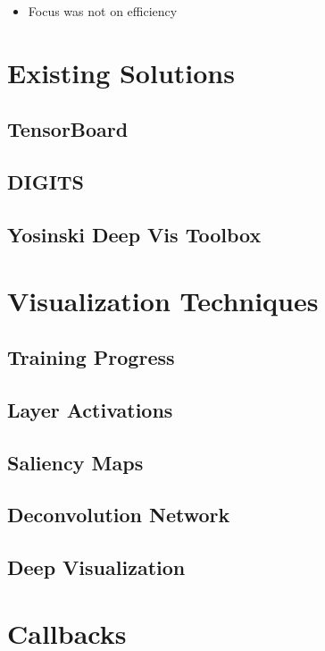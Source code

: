
\begin{itemize}
    \item Focus was not on efficiency
\end{itemize}

\section{Existing Solutions}

\subsection{TensorBoard}

\subsection{DIGITS}

\subsection{Yosinski Deep Vis Toolbox}

\section{Visualization Techniques} 

\subsection{Training Progress}

\subsection{Layer Activations}

\subsection{Saliency Maps}

\subsection{Deconvolution Network}

\subsection{Deep Visualization}

\section{Callbacks}


\cleardoublepage